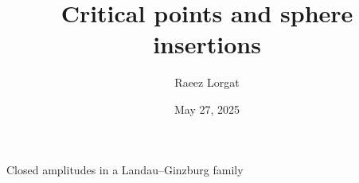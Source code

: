 \usepackage{unicode-math}

\title{Critical points and sphere insertions}
\author{Raeez Lorgat}
\date{May 27, 2025}

\usepackage{etoolbox}
\patchcmd{\maketitle}
  {\thetitle\par}
  {\thetitle\par\vspace{0.25em}%
   {\fontsize{15pt}{18pt}\selectfont Closed amplitudes in a Landau--Ginzburg family\par}}
  {}{\PackageError{sphere-print}{Missing title insertion point}{}}
  {}{\PackageError{sphere-print}{Missing bibliography insertion point}{}}
\apptocmd{\thebibliography}{\raggedright}
  {}{\PackageError{sphere-print}{Missing bibliography formatting point}{}}
\newcommand{\Tr}{\operatorname{Tr}}
\newcommand{\Res}{\operatorname{Res}}
